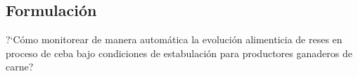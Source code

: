 \subsection{Formulaci\'on}


?`Cómo monitorear de manera automática la evolución alimenticia de reses en proceso de ceba bajo condiciones de estabulación para productores ganaderos de carne? 


